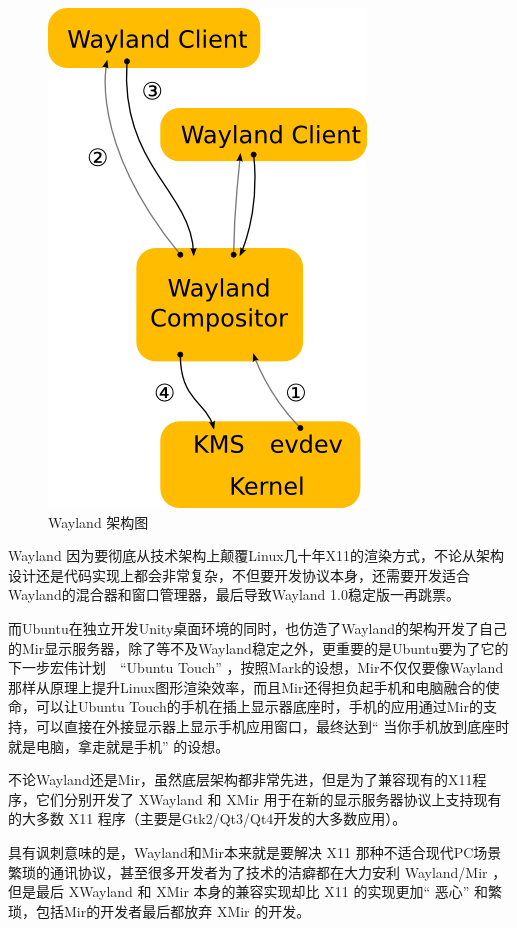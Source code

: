 \documentclass[doctor,openright,twoside]{sjtuthesis}
\theoremstyle{plain}
\theoremstyle{definition}
\theoremstyle{remark}
\theoremstyle{ocrenumbox}
\theoremstyle{plain}
\begin{document}
\begin{figure}
\includegraphics{Wayland-architecture} \caption[Wayland 架构图]{Wayland 架构图}\label{fig:xw-w}
\end{figure}

Wayland 因为要彻底从技术架构上颠覆Linux几十年X11的渲染方式，不论从架构设计还是代码实现上都会非常复杂，不但要开发协议本身，还需要开发适合Wayland的混合器和窗口管理器，最后导致Wayland 1.0稳定版一再跳票。

而Ubuntu在独立开发Unity桌面环境的同时，也仿造了Wayland的架构开发了自己的Mir显示服务器，除了等不及Wayland稳定之外，更重要的是Ubuntu要为了它的下一步宏伟计划　``Ubuntu Touch'' ，按照Mark的设想，Mir不仅仅要像Wayland那样从原理上提升Linux图形渲染效率，而且Mir还得担负起手机和电脑融合的使命，可以让Ubuntu Touch的手机在插上显示器底座时，手机的应用通过Mir的支持，可以直接在外接显示器上显示手机应用窗口，最终达到`` 当你手机放到底座时就是电脑，拿走就是手机'' 的设想。

不论Wayland还是Mir，虽然底层架构都非常先进，但是为了兼容现有的X11程序，它们分别开发了 XWayland 和 XMir 用于在新的显示服务器协议上支持现有的大多数 X11 程序（主要是Gtk2/Qt3/Qt4开发的大多数应用）。

具有讽刺意味的是，Wayland和Mir本来就是要解决 X11 那种不适合现代PC场景繁琐的通讯协议，甚至很多开发者为了技术的洁癖都在大力安利 Wayland/Mir ，但是最后 XWayland 和 XMir 本身的兼容实现却比 X11 的实现更加`` 恶心'' 和繁琐，包括Mir的开发者最后都放弃 XMir 的开发。
\end{document}
